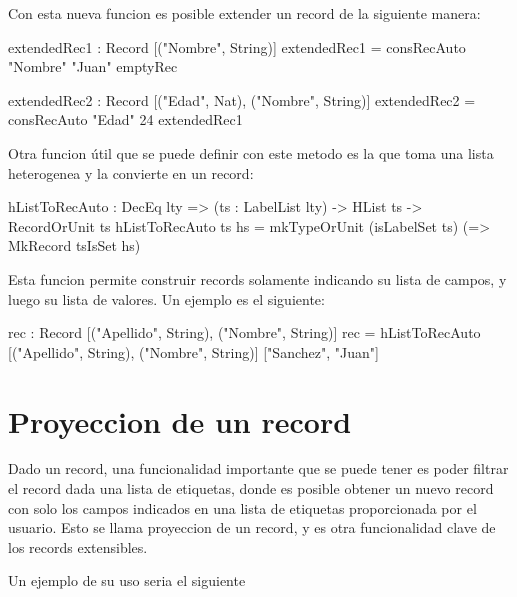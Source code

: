 Con esta nueva funcion es posible extender un record de la siguiente manera:

\begin{code}
extendedRec1 : Record [("Nombre", String)]
extendedRec1 = consRecAuto "Nombre" "Juan" emptyRec

extendedRec2 : Record [("Edad", Nat), ("Nombre", String)]
extendedRec2 = consRecAuto "Edad" 24 extendedRec1
\end{code}

Otra funcion útil que se puede definir con este metodo es la que toma una lista heterogenea y la convierte en un record:

\begin{code}
hListToRecAuto : DecEq lty => (ts : LabelList lty) -> 
  HList ts -> RecordOrUnit ts
hListToRecAuto ts hs = mkTypeOrUnit (isLabelSet ts) 
  (\tsIsSet => MkRecord tsIsSet hs) 
\end{code}

Esta funcion permite construir records solamente indicando su lista de campos, y luego su lista de valores. Un ejemplo es el siguiente:

\begin{code}
rec : Record [("Apellido", String), ("Nombre", String)]
rec = hListToRecAuto 
  [("Apellido", String), ("Nombre", String)] 
  ["Sanchez", "Juan"]
\end{code}

\section{Proyeccion de un record}

Dado un record, una funcionalidad importante que se puede tener es poder filtrar el record dada una lista de etiquetas, donde es posible obtener un nuevo record con solo los campos indicados en una lista de etiquetas proporcionada por el usuario. Esto se llama proyeccion de un record, y es otra funcionalidad clave de los records extensibles.

Un ejemplo de su uso seria el siguiente


